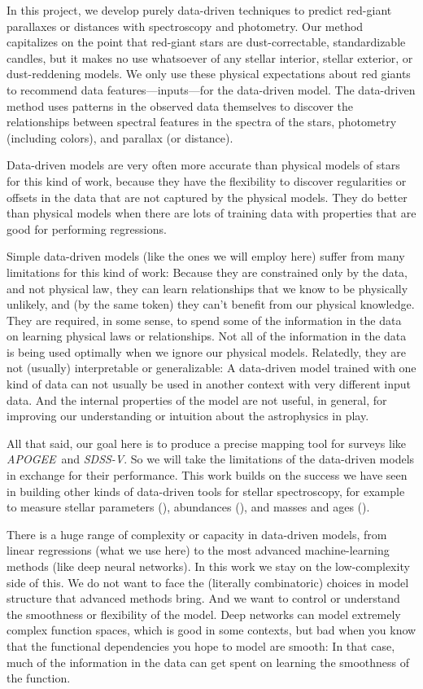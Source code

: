 \documentclass[modern]{aastex62}
\newcommand{\acronym}[1]{{\small{#1}}}
\newcommand{\project}[1]{\textsl{#1}}
\newcommand{\apogee}{\project{\acronym{APOGEE}}}
\newcommand{\sdssv}{\project{\acronym{SDSS-V}}}
\begin{document}
In this project, we develop purely data-driven techniques to predict
red-giant parallaxes or distances with spectroscopy and photometry.
Our method capitalizes on the point that red-giant stars are dust-correctable,
standardizable candles, but it makes no use whatsoever of any stellar interior,
stellar exterior, or dust-reddening models.
We only use these physical expectations about red giants to recommend
data features---inputs---for the data-driven model.
The data-driven method uses patterns in the observed data themselves
to discover the relationships between spectral features in the spectra of the stars,
photometry (including colors), and parallax (or distance).

Data-driven models are very often more accurate than physical models of stars
for this kind of work, because they have the flexibility to discover
regularities or offsets in the data that are not captured by the physical
models.
They do better than physical models when there are lots of training data
with properties that are good for performing regressions.

Simple data-driven models (like the ones we will employ here)
suffer from many limitations for this kind of work:
Because they are constrained only by the data, and not physical law,
they can learn relationships that we know
to be physically unlikely, and (by the same token) they can't benefit from our
physical knowledge.
They are required, in some sense, to spend some of the information in the data on
learning physical laws or relationships.
Not all of the information in the data is being used
optimally when we ignore our physical models.
Relatedly, they are not (usually) interpretable or generalizable:
A data-driven model trained with one kind of data can not usually be used in another
context with very different input data.
And the internal properties of the model are not useful, in general, for improving
our understanding or intuition about the astrophysics in play.

All that said, our goal here is to produce a precise mapping tool for surveys
like \apogee\ and \sdssv.
So we will take the limitations of the data-driven models in exchange for their
performance.
This work builds on the success we have seen in building other kinds of
data-driven tools for  stellar spectroscopy, for example to measure stellar
parameters (\citealt{cannon}), abundances (\citealt{ho, casey, nessdopp}),
and masses and ages (\citealt{nessage}).

There is a huge range of complexity or capacity in data-driven
models, from linear regressions (what we use here) to the most advanced machine-learning
methods (like deep neural networks).
In this work we stay on the low-complexity side of this.
We do not want to face the (literally combinatoric) choices in model structure that
advanced methods bring.
And we want to control or understand the smoothness or flexibility of the model.
Deep networks can model extremely complex function spaces, which is good in some
contexts, but bad when you know that the functional dependencies you hope to
model are smooth:
In that case, much of the information in the data can get spent on learning the
smoothness of the function.
\end{document}
